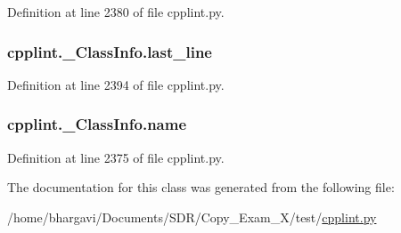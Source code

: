 Definition at line 2380 of file cpplint.\+py.

\subsubsection[{\texorpdfstring{last\+\_\+line}{last_line}}]{\setlength{\rightskip}{0pt plus 5cm}cpplint.\+\_\+\+Class\+Info.\+last\+\_\+line}\hypertarget{classcpplint_1_1___class_info_a72e0f4576cdcb6f3886ed52e2affbc75}{}\label{classcpplint_1_1___class_info_a72e0f4576cdcb6f3886ed52e2affbc75}


Definition at line 2394 of file cpplint.\+py.

\subsubsection[{\texorpdfstring{name}{name}}]{\setlength{\rightskip}{0pt plus 5cm}cpplint.\+\_\+\+Class\+Info.\+name}\hypertarget{classcpplint_1_1___class_info_a3de5f207d3449d735d15ebca779fe336}{}\label{classcpplint_1_1___class_info_a3de5f207d3449d735d15ebca779fe336}


Definition at line 2375 of file cpplint.\+py.



The documentation for this class was generated from the following file\+:\begin{DoxyCompactItemize}
\item 
/home/bhargavi/\+Documents/\+S\+D\+R/\+Copy\+\_\+\+Exam\+\_\+X/test/\hyperlink{cpplint_8py}{cpplint.\+py}\end{DoxyCompactItemize}
